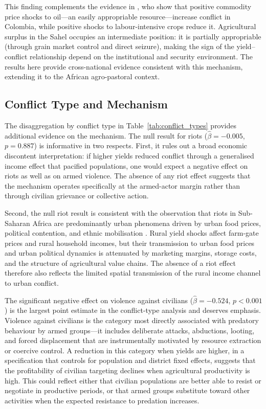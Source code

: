 This finding complements the evidence in \citet{DubeVargas2013}, who show that positive commodity price shocks to oil---an easily appropriable resource---increase conflict in Colombia, while positive shocks to labour-intensive crops reduce it. Agricultural surplus in the Sahel occupies an intermediate position: it is partially appropriable (through grain market control and direct seizure), making the sign of the yield--conflict relationship depend on the institutional and security environment. The results here provide cross-national evidence consistent with this mechanism, extending it to the African agro-pastoral context.

\subsection{Conflict Type and Mechanism}

The disaggregation by conflict type in Table~\ref{tab:conflict_types} provides additional evidence on the mechanism. The null result for riots ($\hat{\beta} = -0.005$, $p = 0.887$) is informative in two respects. First, it rules out a broad economic discontent interpretation: if higher yields reduced conflict through a generalised income effect that pacified populations, one would expect a negative effect on riots as well as on armed violence. The absence of any riot effect suggests that the mechanism operates specifically at the armed-actor margin rather than through civilian grievance or collective action.

Second, the null riot result is consistent with the observation that riots in Sub-Saharan Africa are predominantly urban phenomena driven by urban food prices, political contention, and ethnic mobilisation \citep{BlattmanMiguel2010}. Rural yield shocks affect farm-gate prices and rural household incomes, but their transmission to urban food prices and urban political dynamics is attenuated by marketing margins, storage costs, and the structure of agricultural value chains. The absence of a riot effect therefore also reflects the limited spatial transmission of the rural income channel to urban conflict.

The significant negative effect on violence against civilians ($\hat{\beta} = -0.524$, $p < 0.001$) is the largest point estimate in the conflict-type analysis and deserves emphasis. Violence against civilians is the category most directly associated with predatory behaviour by armed groups---it includes deliberate attacks, abductions, looting, and forced displacement that are instrumentally motivated by resource extraction or coercive control. A reduction in this category when yields are higher, in a specification that controls for population and district fixed effects, suggests that the profitability of civilian targeting declines when agricultural productivity is high. This could reflect either that civilian populations are better able to resist or negotiate in productive periods, or that armed groups substitute toward other activities when the expected resistance to predation increases.

